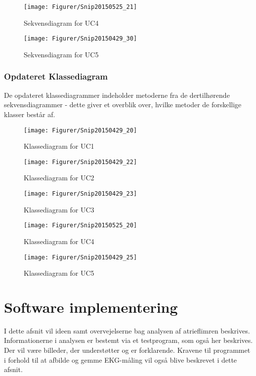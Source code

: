 \begin{figure}[H]
	\centering
	\texttt{[image: Figurer/Snip20150525\_21]}
	\caption{Sekvensdiagram for UC4}
\end{figure}

\begin{figure}[H]
	\centering
	\texttt{[image: Figurer/Snip20150429\_30]}
	\caption{Sekvensdiagram for UC5}
\end{figure}

\subsubsection{Opdateret Klassediagram}
De opdateret klassediagrammer indeholder metoderne fra de dertilhørende  sekvensdiagrammer - dette giver et overblik over, hvilke metoder de forskellige klasser består af.

\begin{figure}[H]
	\centering
	\texttt{[image: Figurer/Snip20150429\_20]}
	\caption{Klassediagram for UC1}
\end{figure}  

\begin{figure}[H]
	\centering
	\texttt{[image: Figurer/Snip20150429\_22]}
	\caption{Klassediagram for UC2}
\end{figure}

\begin{figure}[H]
	\centering
	\texttt{[image: Figurer/Snip20150429\_23]}
	\caption{Klassediagram for UC3}
\end{figure}

\begin{figure}[H]
	\centering
	\texttt{[image: Figurer/Snip20150525\_20]}
	\caption{Klassediagram for UC4}
\end{figure}

\begin{figure}[H]
	\centering
	\texttt{[image: Figurer/Snip20150429\_25]}
	\caption{Klassediagram for UC5}
\end{figure}

\section{Software implementering}
I dette afsnit vil ideen samt overvejelserne bag analysen af atrieflimren beskrives. Informationerne i analysen er bestemt via et testprogram, som også her beskrives. Der vil være billeder, der understøtter og er forklarende. Kravene til programmet i forhold til at afbilde og gemme EKG-måling vil også blive beskrevet i dette afsnit. 

